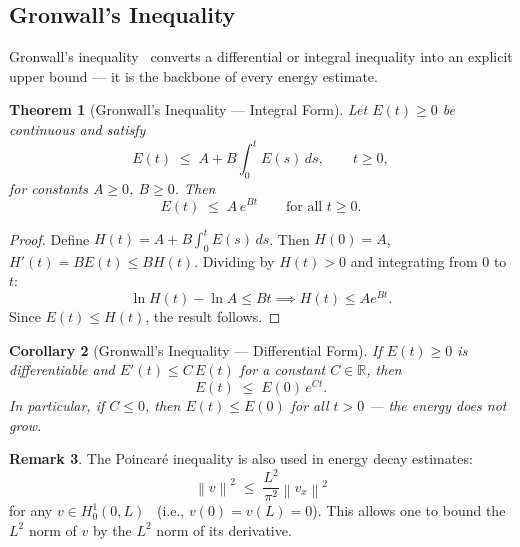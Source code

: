 \documentclass[12pt,a4paper]{article}
\theoremstyle{plain}
\newtheorem{theorem}{Theorem}[section]
\newtheorem{corollary}[theorem]{Corollary}
\theoremstyle{definition}
\newtheorem{remark}[theorem]{Remark}
\newcommand{\R}{\mathbb{R}}
\newcommand{\norm}[1]{\left\lVert #1 \right\rVert}
\begin{document}
\subsection{Gronwall's Inequality}

Gronwall's inequality~\cite{Gronwall} converts a differential or integral inequality into an
explicit upper bound — it is the backbone of every energy estimate.

\begin{theorem}[Gronwall's Inequality — Integral Form]
\label{thm:gronwall}
Let $E(t)\geq 0$ be continuous and satisfy
\begin{equation}
  E(t) \;\leq\; A + B\int_0^t E(s)\,ds, \qquad t\geq 0,
  \label{eq:gronwall-int}
\end{equation}
for constants $A\geq 0$, $B\geq 0$. Then
\begin{equation}
  E(t) \;\leq\; A\,e^{Bt} \qquad \text{for all } t\geq 0.
  \label{eq:gronwall-bound}
\end{equation}
\end{theorem}

\begin{proof}
Define $H(t) = A + B\int_0^t E(s)\,ds$. Then $H(0)=A$, $H'(t)=BE(t)\leq BH(t)$.
Dividing by $H(t)>0$ and integrating from $0$ to $t$:
\[
  \ln H(t) - \ln A \leq Bt \implies H(t)\leq A e^{Bt}.
\]
Since $E(t)\leq H(t)$, the result follows.
\end{proof}

\begin{corollary}[Gronwall's Inequality — Differential Form]
\label{cor:gronwall-diff}
  If $E(t)\geq 0$ is differentiable and $E'(t)\leq C\,E(t)$ for a constant
  $C\in\R$, then
  \begin{equation}
    E(t) \;\leq\; E(0)\,e^{Ct}.
    \label{eq:gronwall-diff}
  \end{equation}
  In particular, if $C\leq 0$, then $E(t)\leq E(0)$ for all $t>0$ — the energy
  does not grow.
\end{corollary}

\begin{remark}
The Poincar\'{e} inequality is also used in energy decay estimates:
\begin{equation}
  \norm{v}^2 \;\leq\; \frac{L^2}{\pi^2}\norm{v_x}^2
  \label{eq:poincare}
\end{equation}
for any $v\in H^1_0(0,L)$~\cite{Brezis} (i.e., $v(0)=v(L)=0$). This allows one to bound the
$L^2$ norm of $v$ by the $L^2$ norm of its derivative.
\end{remark}
\end{document}
